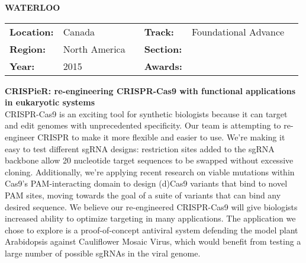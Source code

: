 \textbf{\uppercase{Waterloo}}
\FloatBarrier
\begin{table}[h]
\begin{tabular}{lp{2.5cm}llll}
\textbf{Location:} & Canada & \multicolumn{1}{|l}{} & \textbf{Track:}   & Foundational Advance \\
\textbf{Region:}   & North America   & \multicolumn{1}{|l}{} & \textbf{Section:} &  \\
\textbf{Year:}     & 2015   & \multicolumn{1}{|l}{} & \textbf{Awards:}  &
\end{tabular}
\end{table}
\FloatBarrier
\noindent	\textbf{CRISPieR: re-engineering CRISPR-Cas9 with functional applications in eukaryotic systems} \vspace{.2cm}\\
CRISPR-Cas9 is an exciting tool for synthetic biologists because it can target and edit genomes with unprecedented specificity. Our team is attempting to re-engineer CRISPR to make it more flexible and easier to use. We’re making it easy to test different sgRNA designs: restriction sites added to the sgRNA backbone allow 20 nucleotide target sequences to be swapped without excessive cloning. Additionally, we’re applying recent research on viable mutations within Cas9’s PAM-interacting domain to design (d)Cas9 variants that bind to novel PAM sites, moving towards the goal of a suite of variants that can bind any desired sequence.
We believe our re-engineered CRISPR-Cas9 will give biologists increased ability to optimize targeting in many applications. The application we chose to explore is a proof-of-concept antiviral system defending the model plant Arabidopsis against Cauliflower Mosaic Virus, which would benefit from testing a large number of possible sgRNAs in the viral genome.
\vspace{2cm} $ $
\pagebreak



